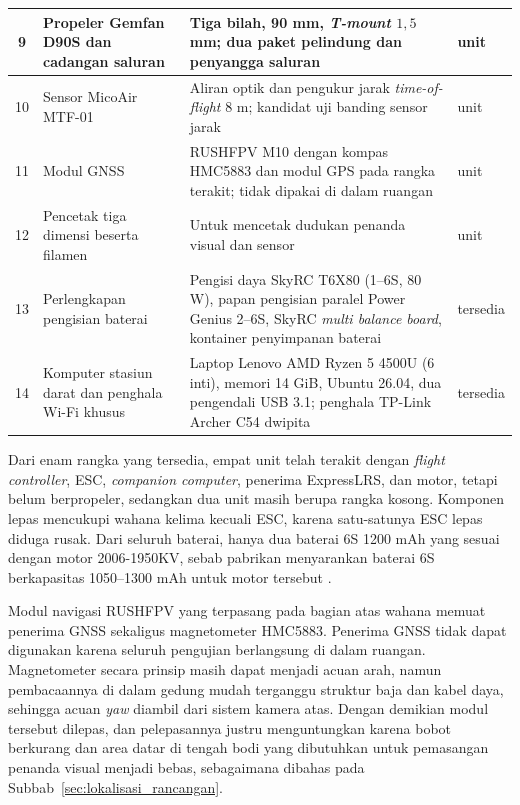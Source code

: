 \documentclass[12pt,a4paper]{report}
\begin{document}
\begin{table}[htbp]
\begin{tabularx}{\textwidth}{|c|>{\raggedright\arraybackslash}p{3.6cm}|>{\raggedright\arraybackslash}X|>{\centering\arraybackslash}p{1.6cm}|}
        9 & Propeler Gemfan D90S dan cadangan saluran & Tiga bilah, 90 mm, \textit{T-mount} $1{,}5$ mm; dua paket pelindung dan penyangga saluran & 14 unit \\ \hline
        10 & Sensor MicoAir MTF-01 & Aliran optik dan pengukur jarak \textit{time-of-flight} 8 m; kandidat uji banding sensor jarak & 3 unit \\ \hline
        11 & Modul GNSS & RUSHFPV M10 dengan kompas HMC5883 dan modul GPS pada rangka terakit; tidak dipakai di dalam ruangan & 6 unit \\ \hline
        12 & Pencetak tiga dimensi beserta filamen & Untuk mencetak dudukan penanda visual dan sensor & 1 unit \\ \hline
        13 & Perlengkapan pengisian baterai & Pengisi daya SkyRC T6X80 (1--6S, 80 W), papan pengisian paralel Power Genius 2--6S, SkyRC \textit{multi balance board}, kontainer penyimpanan baterai & tersedia \\ \hline
        14 & Komputer stasiun darat dan penghala Wi-Fi khusus & Laptop Lenovo AMD Ryzen 5 4500U (6 inti), memori 14 GiB, Ubuntu 26.04, dua pengendali USB 3.1; penghala TP-Link Archer C54 dwipita & tersedia \\ \hline
    \end{tabularx}
    \endgroup
\end{table}

Dari enam rangka yang tersedia, empat unit telah terakit dengan \textit{flight controller}, ESC, \textit{companion computer}, penerima ExpressLRS, dan motor, tetapi belum berpropeler, sedangkan dua unit masih berupa rangka kosong. Komponen lepas mencukupi wahana kelima kecuali ESC, karena satu-satunya ESC lepas diduga rusak. Dari seluruh baterai, hanya dua baterai 6S 1200 mAh yang sesuai dengan motor 2006-1950KV, sebab pabrikan menyarankan baterai 6S berkapasitas 1050--1300 mAh untuk motor tersebut \cite{speedybeeBee35}.

Modul navigasi RUSHFPV yang terpasang pada bagian atas wahana memuat penerima GNSS sekaligus magnetometer HMC5883. Penerima GNSS tidak dapat digunakan karena seluruh pengujian berlangsung di dalam ruangan. Magnetometer secara prinsip masih dapat menjadi acuan arah, namun pembacaannya di dalam gedung mudah terganggu struktur baja dan kabel daya, sehingga acuan \textit{yaw} diambil dari sistem kamera atas. Dengan demikian modul tersebut dilepas, dan pelepasannya justru menguntungkan karena bobot berkurang dan area datar di tengah bodi yang dibutuhkan untuk pemasangan penanda visual menjadi bebas, sebagaimana dibahas pada Subbab~\ref{sec:lokalisasi_rancangan}.
\end{document}
